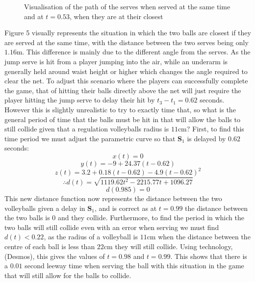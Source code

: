 \documentclass{article}
\begin{document}
\begin{figure}[H]
														\caption{Visualisation of the path of the serves when served at the same time and at \(t = 0.53\), when they are at their closest}
													\end{figure}

													Figure 5 visually represents the situation in which the two balls are closest if they are served at the same time, with the distance between the two serves being only \(1.16\)m. This difference is mainly due to the different angle from the serves. As the jump serve is hit from a player jumping into the air, while an underarm is generally held around waist height or higher which changes the angle required to clear the net.
													To adjust this scenario where the players can successfully complete the game, that of hitting their balls directly above the net will just require the player hitting the jump serve to delay their hit by \(t_{3} - t_{1} = 0.62\) seconds. However this is slightly unrealistic to try to exactly time that, so what is the general period of time that the balls must be hit in that will allow the balls to still collide given that a regulation volleyballs radius is \(11\)cm?
													First, to find this time period we must adjust the parametric curve so that \(\mathbf{S}_{1}\) is delayed by \(0.62\) seconds:
													\[x(t) = 0\]
													\[y(t) = -9 + 24.37(t-0.62)\]
													\[z(t) = 3.2 + 0.18(t-0.62) - 4.9(t-0.62)^{2}\]
													\[\therefore d(t) = \sqrt{1119.62t^{2} - 2215.77t + 1096.27}\]
													\[d(0.985) = 0\]
													This new distance function now represents the distance between the two volleyballs given a delay in \(\mathbf{S}_{1}\), and is correct as at \(t = 0.99\) the distance between the two balls is \(0\) and they collide. Furthermore, to find the period in which the two balls will still collide even with an error when serving we must find \(d(t) < 0.22\), as the radius of a volleyball is \(11\)cm when the distance between the centre of each ball is less than \(22\)cm they will still collide. Using technology, (Desmos), this gives the values of \(t = 0.98\) and \(t = 0.99\). This shows that there is a \(0.01\) second leeway time when serving the ball with this situation in the game that will still allow for the balls to collide.
\end{document}
